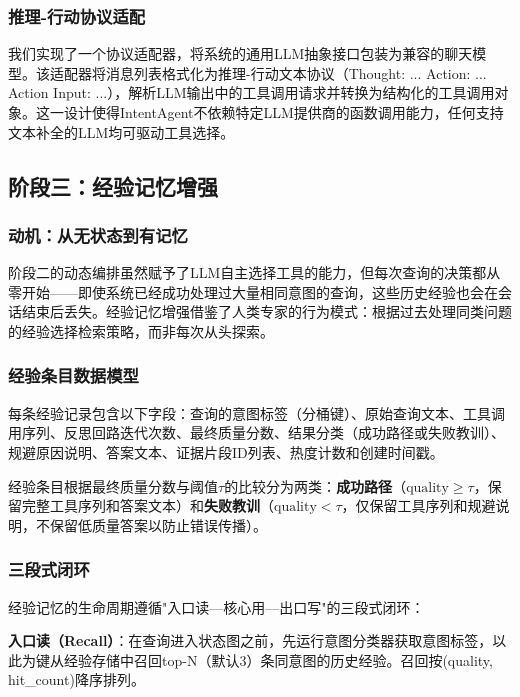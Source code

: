 \documentclass[runningheads]{llncs}
\begin{document}
\subsubsection{推理-行动协议适配}

我们实现了一个协议适配器，将系统的通用LLM抽象接口包装为兼容的聊天模型。该适配器将消息列表格式化为推理-行动文本协议（Thought: ... Action: ... Action Input: ...），解析LLM输出中的工具调用请求并转换为结构化的工具调用对象。这一设计使得IntentAgent不依赖特定LLM提供商的函数调用能力，任何支持文本补全的LLM均可驱动工具选择。

\subsection{阶段三：经验记忆增强}

\subsubsection{动机：从无状态到有记忆}

阶段二的动态编排虽然赋予了LLM自主选择工具的能力，但每次查询的决策都从零开始——即使系统已经成功处理过大量相同意图的查询，这些历史经验也会在会话结束后丢失。经验记忆增强借鉴了人类专家的行为模式：根据过去处理同类问题的经验选择检索策略，而非每次从头探索。

\subsubsection{经验条目数据模型}

每条经验记录包含以下字段：查询的意图标签（分桶键）、原始查询文本、工具调用序列、反思回路迭代次数、最终质量分数、结果分类（成功路径或失败教训）、规避原因说明、答案文本、证据片段ID列表、热度计数和创建时间戳。

经验条目根据最终质量分数与阈值$\tau$的比较分为两类：\textbf{成功路径}（$\text{quality} \geq \tau$，保留完整工具序列和答案文本）和\textbf{失败教训}（$\text{quality} < \tau$，仅保留工具序列和规避说明，不保留低质量答案以防止错误传播）。

\subsubsection{三段式闭环}

经验记忆的生命周期遵循"入口读—核心用—出口写"的三段式闭环：

\textbf{入口读（Recall）}：在查询进入状态图之前，先运行意图分类器获取意图标签，以此为键从经验存储中召回top-N（默认3）条同意图的历史经验。召回按(quality, hit\_count)降序排列。
\end{document}
